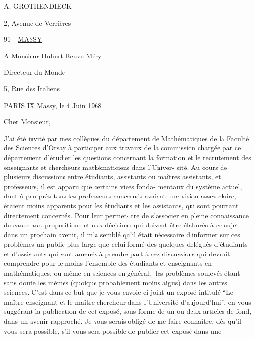 A. GROTHENDIECK

2, Avenue de Verrières

91 - \uline{MASSY}

A Monsieur Hubert Beuve-Méry

Directeur du Monde

5, Rue des Italiens

\uline{PARIS} IX \hfill Massy, le 4 Juin 1968

Cher Monsieur,

J'ai été invité par mes collègues du département de Mathématiques
de la Faculté des Sciences d'Orsay à participer aux travaux de la commission
chargée par ce département d'étudier les questions concernant la formation
et le recrutement des enseignants et chercheurs mathématiciens dans l'Univer-%
sité. Au cours de plusieurs discussions entre étudiants, assistants ou
maîtres assistants, et professeurs, il est apparu que certains vices fonda-%
mentaux du système actuel, dont à peu près tous les professeurs concernés
avaient une vision assez claire, étaient moins apparents pour les étudiants
et les assistants, qui sont pourtant directement concernés. Pour leur permet-%
tre de s'associer en pleine connaissance de cause aux propositions et aux
décisions qui doivent être élaborés à ce sujet dans un prochain avenir, il
m'a semblé qu'il était nécessaire d'informer sur ces problèmes un public
plus large que celui formé des quelques delégués d'étudiants et d'assistants
qui sont amenés à prendre part à ces discussions\hand{,} qui devrait comprendre pour
le moins l'ensemble des étudiants et enseignants en mathématiques, ou même
en sciences en général,- les problèmes soulevés étant sans doute les mêmes
(quoique probablement moins aigus) dans les autres sciences. C'est dans ce
but que je vous envoie ci-joint un exposé intitulé ``Le maître-enseignant et
le maître-chercheur dans l'Université d'aujourd'hui'', en vous suggérant la
publication de cet exposé, sous forme de un ou deux articles de fond, dans
un avenir rapproché. Je vous serais obligé de me faire connaître, dès qu'il
vous sera possible, s'il vous sera possible de publier cet exposé dans une

